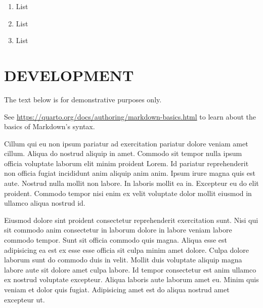 \documentclass[
  12pt,
  a4paper,
  oneside]{tesesusp}
\providecommand{\tightlist}{%
  \setlength{\itemsep}{0pt}\setlength{\parskip}{0pt}}\usepackage{longtable,booktabs,array}
\begin{document}
\begin{enumerate}
\def\labelenumi{\arabic{enumi}.}
\tightlist
\item
  List
\item
  List
\item
  List
\end{enumerate}


\hypertarget{development}{%
\chapter{DEVELOPMENT}\label{development}}

\begin{tcolorbox}[enhanced jigsaw, colback=white, breakable, title=\textcolor{quarto-callout-warning-color}{\faExclamationTriangle}\hspace{0.5em}{Warning}, colbacktitle=quarto-callout-warning-color!10!white, coltitle=black, bottomrule=.15mm, left=2mm, opacitybacktitle=0.6, colframe=quarto-callout-warning-color-frame, rightrule=.15mm, opacityback=0, toptitle=1mm, leftrule=.75mm, bottomtitle=1mm, titlerule=0mm, arc=.35mm, toprule=.15mm]

The text below is for demonstrative purposes only.

\vspace{5pt}

See \url{https://quarto.org/docs/authoring/markdown-basics.html} to
learn about the basics of Markdown's syntax.

\end{tcolorbox}

\vspace{10pt}

Cillum qui eu non ipsum pariatur ad exercitation pariatur dolore veniam
amet cillum. Aliqua do nostrud aliquip in amet. Commodo sit tempor nulla
ipsum officia voluptate laborum elit minim proident Lorem. Id pariatur
reprehenderit non officia fugiat incididunt anim aliquip anim anim.
Ipsum irure magna quis est aute. Nostrud nulla mollit non labore. In
laboris mollit ea in. Excepteur eu do elit proident. Commodo tempor nisi
enim ex velit voluptate dolor mollit eiusmod in ullamco aliqua nostrud
id.

Eiusmod dolore sint proident consectetur reprehenderit exercitation
sunt. Nisi qui sit commodo anim consectetur in laborum dolore in labore
veniam labore commodo tempor. Sunt sit officia commodo quis magna.
Aliqua esse est adipisicing ea est ex esse esse officia sit culpa minim
amet dolore. Culpa dolore laborum sunt do commodo duis in velit. Mollit
duis voluptate aliquip magna labore aute sit dolore amet culpa labore.
Id tempor consectetur est anim ullamco ex nostrud voluptate excepteur.
Aliqua laboris aute laborum amet eu. Minim quis veniam et dolor quis
fugiat. Adipisicing amet est do aliqua nostrud amet excepteur ut.
\end{document}
